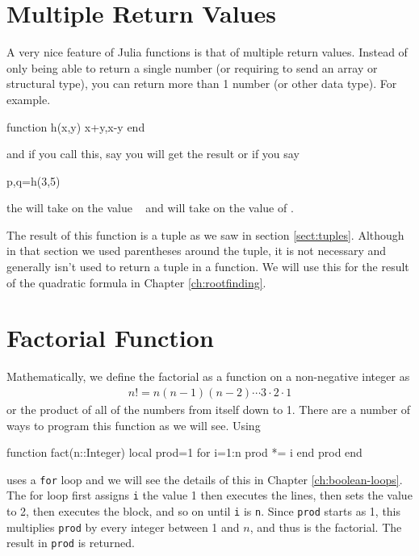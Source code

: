 \section{Multiple Return Values}

A very nice feature of Julia functions is that of multiple return
values. Instead of only being able to return a single number (or
requiring to send an array or structural type), you can return more than
1 number (or other data type). For example.

\begin{jlblock}[functions]
function h(x,y)
  x+y,x-y
end
\end{jlblock}
%
and if you call this, say  you will get the result  \printpythontex[verb] or if you say
%
\begin{jlblock}[functions]
p,q=h(3,5)
\end{jlblock}
%
the  will take on the value  \printpythontex[verb]~ and  will take on the value of \printpythontex[verb].

The result of this function is a tuple as we saw in section \ref{sect:tuples}. Although in that section we used parentheses around the tuple, it is not necessary and generally isn't used to return a tuple in a function.  We will use this for the result of the quadratic formula in Chapter \ref{ch:rootfinding}. 

\hypertarget{sect:factorial}{%
\section{Factorial Function}\label{sect:factorial}}

Mathematically, we define the factorial as a function on a non-negative
integer as 
\begin{align*}
n! = n(n-1)(n-2)\cdots 3 \cdot 2 \cdot 1
\end{align*}
%
or the product of all of the numbers from itself down to 1. There are a
number of ways to program this function as we will see. Using 
%
\begin{jlblock}[functions]
function fact(n::Integer)
  local prod=1
  for i=1:n
    prod *= i
  end
  prod
end
\end{jlblock}
%
uses a \texttt{for} loop and we will see the details of this in Chapter \ref{ch:boolean-loops}. The for loop first assigns \verb!i! the value 1 then executes the lines, then sets the value to 2, then executes the block, and so on until \verb!i! is \verb!n!.  Since \texttt{prod} starts as 1, this multiplies \texttt{prod} by every integer between 1 and $n$, and thus is the factorial.  The result in \verb!prod! is returned.  

